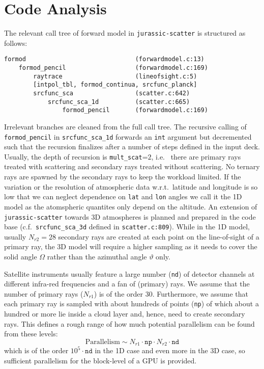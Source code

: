\documentclass[12pt,a4paper,titlepage,twoside]{article}
\newcommand{\ttt}[1]{\texttt{#1}}
\begin{document}
\section{Code Analysis}\label{sec:analysis}
The relevant call tree of forward model in \ttt{jurassic-scatter} is structured as follows:
\begin{Verbatim}[tabsize=4]
formod 								(forwardmodel.c:13)
	formod_pencil					(forwardmodel.c:169)
		raytrace					(lineofsight.c:5)
		[intpol_tbl, formod_continua, srcfunc_planck]
		srcfunc_sca					(scatter.c:642)
			srcfunc_sca_1d 			(scatter.c:665)
				formod_pencil		(forwardmodel.c:169)
\end{Verbatim}
Irrelevant branches are cleaned from the full call tree.
The recursive calling of \ttt{formod\_pencil} 
in \ttt{srcfunc\_sca\_1d} forwards an \ttt{int} argument
but decremented such that the recursion finalizes
after a number of steps defined in the input deck.
Usually, the depth of recursion is \ttt{mult\_scat}=$2$, i.e.~
there are primary rays treated with scattering
and secondary rays treated without scattering.
No ternary rays are spawned by the secondary rays 
to keep the workload limited.
If the variation or the resolution of atmospheric data
w.r.t.~latitude and longitude is so low that we can neglect
dependence on \ttt{lat} and \ttt{lon} angles we call it
the 1D model as the atomspheric quantites only depend on the altitude.
An extension of \ttt{jurassic-scatter} towards 3D atmospheres
is planned and prepared in the code base 
(c.f.~\ttt{srcfunc\_sca\_3d} defined in \ttt{scatter.c:809}).
While in the 1D model, usually $N_{r2} = 28$ secondary rays are created
at each point on the line-of-sight of a primary ray, the 3D
model will require a higher sampling as it needs to cover the solid
angle $\Omega$ rather than the azimuthal angle $\vartheta$ only.

Satellite instruments usually feature 
a large number (\ttt{nd}) of detector channels at different infra-red frequencies
and
a fan of (primary) rays. 
We assume that the number of primary rays ($N_{r1}$) is of the order $30$.
Furthermore, we assume that each primary ray is sampled with about hundreds of points
(\ttt{np}) of which about a hundred or more lie inside a cloud layer and, hence,
need to create secondary rays.
This defines a rough range of how much potential parallelism can be found from these
levels:
$$ \text{Parallelism} \sim  N_{r1} \cdot \ttt{np} \cdot N_{r2} \cdot \ttt{nd} $$
which is of the order $10^5 \cdot \ttt{nd}$ in the 1D case and even more in the 3D case, 
so sufficient parallelism for the block-level of a GPU is provided.
\end{document}
